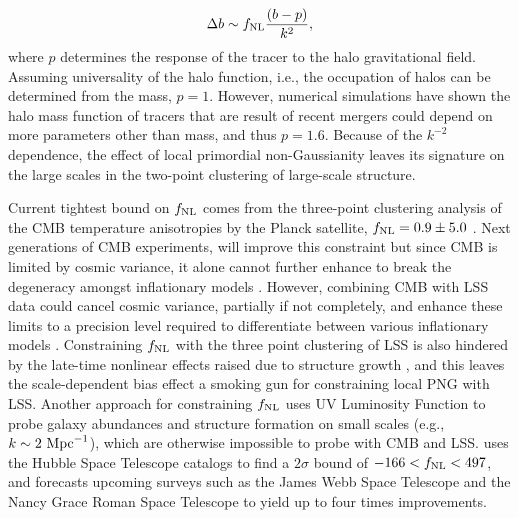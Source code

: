 \begin{equation}\label{eq:db}
\Delta b \sim f_{\rm NL} \frac{(b - p)}{k^{2}},
\end{equation}
where $p$ determines the response of the tracer to the halo gravitational field. Assuming universality of the halo function, i.e., the occupation of halos can be determined from the mass, $p=1$. However, numerical simulations have shown the halo mass function of tracers that are result of recent mergers could depend on more parameters other than mass, and thus $p=1.6$.  Because of the $k^{-2}$ dependence, the effect of local primordial non-Gaussianity leaves its signature on the large scales in the two-point clustering of large-scale structure. 

Current tightest bound on $f_{\rm NL}$ comes from the three-point clustering analysis of the CMB temperature anisotropies by the Planck satellite, $f_{\rm NL}=0.9\pm 5.0$ \citep{akrami2019planck}. Next generations of CMB experiments, will improve this constraint but since CMB is limited by cosmic variance, it alone cannot further enhance to break the degeneracy amongst inflationary models \citep[see, e.g.,][]{ade2019simons}. However, combining CMB with LSS data could cancel cosmic variance, partially if not completely, and enhance these limits to a precision level required to differentiate between various inflationary models \citep[see, e.g.,][]{schmittfull2018PhRvD}.  Constraining $f_{\rm NL}$ with the three point clustering of LSS is also hindered by the late-time nonlinear effects raised due to structure growth \citep{baldauf2011galaxy, baldauf2011primordial}, and this leaves the scale-dependent bias effect a smoking gun for constraining local PNG with LSS. Another approach for constraining $f_{\rm NL}$ uses UV Luminosity Function to probe galaxy abundances and structure formation on small scales (e.g., $k \sim 2~{\rm Mpc}^{-1}$), which are otherwise impossible to probe with CMB and LSS. \cite{sabti2021JCAP} uses the Hubble Space Telescope catalogs \citep{bouwens2015ApJ} to find a $2\sigma$ bound of $-166<f_{\rm NL}<497$, and forecasts upcoming surveys such as the James Webb Space Telescope and the Nancy Grace Roman Space Telescope to yield up to four times improvements.

